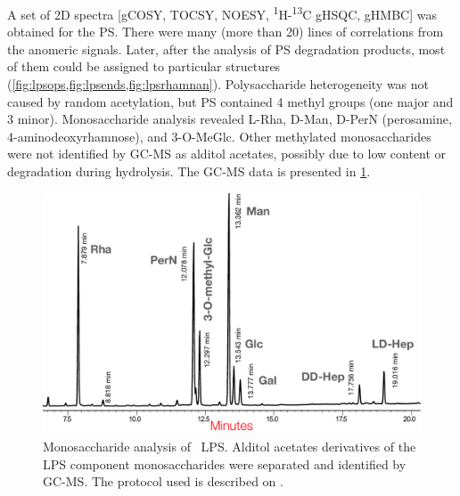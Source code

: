		A set of 2D spectra [\ac{gCOSY}, \ac{TOCSY}, \ac{NOESY}, \textsuperscript{1}H-\textsuperscript{13}C \ac{gHSQC}, \ac{gHMBC}] was obtained for the \ac{PS}. There were many (more than 20) lines of correlations from the anomeric signals. Later, after the analysis of \ac{PS} degradation products, most of them could be assigned to particular structures (\cref{fig:lpsops,fig:lpsends,fig:lpsrhamnan}). Polysaccharide heterogeneity was not caused by random acetylation, but \ac{PS} contained 4 methyl groups (one major and 3 minor). Monosaccharide analysis revealed L-Rha, D-Man, D-PerN (perosamine, 4-aminodeoxyrhamnose), and 3-O-MeGlc. Other methylated monosaccharides were not identified by \ac{GC-MS} as alditol acetates, possibly due to low content or degradation during hydrolysis. The \ac{GC-MS} data is presented in \cref{fig:monosaccharide_analysis}.

		\begin{figure}[htb]  %
			\begin{center}
				\includegraphics[width=\textwidth]{lps_chapter/img/lps_monosaccharides.pdf}
			\end{center}
			\caption[Monosaccharide analysis of \ac{LPS}]{Monosaccharide analysis of \caulobacter\ \ac{LPS}. Alditol acetates derivatives of the \ac{LPS} component monosaccharides were separated and identified by \ac{GC-MS}. The protocol used is described on .}
			\label{fig:monosaccharide_analysis}
		\end{figure}

